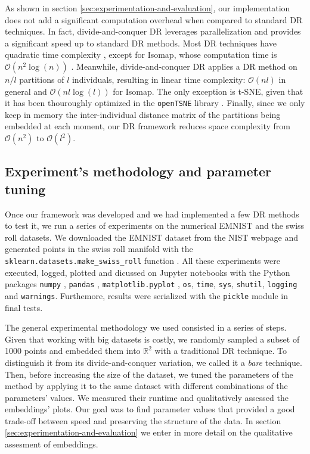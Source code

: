 As shown in section \ref{sec:experimentation-and-evaluation}, our implementation does not add a significant computation overhead when compared to standard DR techniques. In fact, divide-and-conquer DR leverages parallelization and provides a significant speed up to standard DR methods. Most DR techniques have quadratic time complexity \citep{Kruskal1964a,Kruskal1964b,Chen2009, Vandermaaten2008}, except for Isomap, whose computation time is $\mathcal{O}(n^2\log(n))$ \citep{Tenenbaum2000}. Meanwhile, divide-and-conquer DR applies a DR method on $n/l$ partitions of $l$ individuals, resulting in linear time complexity: $\mathcal{O}(nl)$ in general and $\mathcal{O}(nl\log(l))$ for Isomap. The only exception is t-SNE, given that it has been thouroughly optimized in the \verb|openTSNE| library \citep{Policar2024}. Finally, since we only keep in memory the inter-individual distance matrix of the partitions being embedded at each moment, our DR framework reduces space complexity from $\mathcal{O}(n^2)$ to $\mathcal{O}(l^2)$.


\subsection{Experiment's methodology and parameter tuning}
\label{sec:experiment-methodology-parameter-tuning}

Once our framework was developed and we had implemented a few DR methods to test it, we run a series of experiments on the numerical EMNIST \citep{Cohen2017} and the swiss roll \citep{Tenenbaum2000} datasets. We downloaded the EMNIST dataset from the NIST webpage \citep{NIST2024} and generated points in the swiss roll manifold with the \verb|sklearn.datasets.make_swiss_roll| function \citep{Pedregosa2011}. All these experiments were executed, logged, plotted and dicussed on Jupyter notebooks \citep{Kluyver2016} with the Python packages \verb|numpy| \citep{Harris2020}, \verb|pandas| \citep{Mckinney2010}, \verb|matplotlib.pyplot| \citep{Hunter2007}, \verb|os|, \verb|time|, \verb|sys|, \verb|shutil|, \verb|logging| and \verb|warnings|. Furthemore, results were serialized with the \verb|pickle| module in final tests.

The general experimental methodology we used consisted in a series of steps. Given that working with big datasets is costly, we randomly sampled a subset of 1000 points and embedded them into $\mathbb{R}^2$ with a traditional DR technique. To distinguish it from its divide-and-conquer variation, we called it a \textit{bare} technique. Then, before increasing the size of the dataset, we tuned the parameters of the method by applying it to the same dataset with different combinations of the parameters' values. We measured their runtime and qualitatively assessed the embeddings' plots. Our goal was to find parameter values that provided a good trade-off between speed and preserving the structure of the data. In section \ref{sec:experimentation-and-evaluation} we enter in more detail on the qualitative assesment of embeddings.

